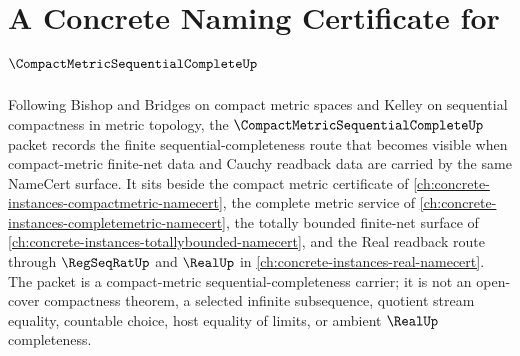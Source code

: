\chapter{A Concrete Naming Certificate for $\CompactMetricSequentialCompleteUp$}
\label{ch:concrete-instances-compact-metric-sequential-complete-namecert}

Following Bishop and Bridges on compact metric spaces and Kelley on sequential compactness in metric topology, the $\CompactMetricSequentialCompleteUp$ packet records the finite sequential-completeness route that becomes visible when compact-metric finite-net data and Cauchy readback data are carried by the same NameCert surface. It sits beside the compact metric certificate of \autoref{ch:concrete-instances-compactmetric-namecert}, the complete metric service of \autoref{ch:concrete-instances-completemetric-namecert}, the totally bounded finite-net surface of \autoref{ch:concrete-instances-totallybounded-namecert}, and the Real readback route through $\RegSeqRatUp$ and $\RealUp$ in \autoref{ch:concrete-instances-real-namecert}. The packet is a compact-metric sequential-completeness carrier; it is not an open-cover compactness theorem, a selected infinite subsequence, quotient stream equality, countable choice, host equality of limits, or ambient $\RealUp$ completeness.

